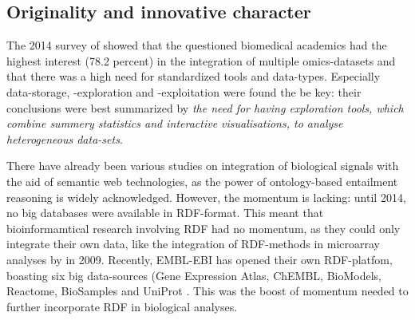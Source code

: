 \documentclass[twoside,fontsize=10pt]{article}
\begin{document}
%



\subsection*{Originality and innovative character} 
The 2014 survey of \citet{Gomez-Cabrero2014} showed that the questioned biomedical academics had the highest interest (78.2 percent) in the integration of multiple omics-datasets and that there was a high need for standardized tools and data-types. Especially data-storage, -exploration and -exploitation were found the be key: their conclusions were best summarized by \textit{the need for having exploration tools, which combine summery statistics and interactive visualisations, to analyse heterogeneous data-sets}.
\medskip

\noindent
There have already been various studies on integration of biological signals with the aid of semantic web technologies, as the power of ontology-based entailment reasoning is widely acknowledged\cite{Sahoo2008}. However, the momentum is lacking: until 2014, no big databases were available in RDF-format. This meant that bioinformamtical research involving RDF had no momentum, as they could only integrate their own data, like the integration of RDF-methods in microarray analyses by \citet{Szpakowski2009} in 2009. Recently, EMBL-EBI has opened their own RDF-platfom, boasting six big data-sources (Gene Expression Atlas, ChEMBL, BioModels, Reactome, BioSamples and UniProt \cite{Jupp2014}. This was the boost of momentum needed to further incorporate RDF in biological analyses.
\end{document}
